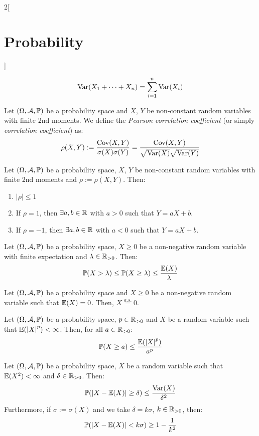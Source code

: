 \documentclass[../../../main.tex]{subfiles}
\begin{document}
\begin{multicols}{2}[\section{Probability}]
\begin{corollary}
        $$\operatorname{Var}(X_1+\cdots+X_n)=\sum_{i=1}^n\operatorname{Var}(X_i)$$
    \end{corollary}
    \begin{definition}
        Let $(\Omega,\mathcal{A},\mathbb{P})$ be a probability space and $X$, $Y$ be non-constant random variables with finite 2nd moments. We define the \textit{Pearson correlation coefficient} (or simply \textit{correlation coefficient}) as: $$\rho(X,Y):=\frac{\operatorname{Cov}(X,Y)}{\sigma(X)\sigma(Y)}=\frac{\operatorname{Cov}(X,Y)}{\sqrt{\operatorname{Var}(X)}\sqrt{\operatorname{Var}(Y)}}$$
    \end{definition}
    \begin{prop}
        Let $(\Omega,\mathcal{A},\mathbb{P})$ be a probability space, $X$, $Y$ be non-constant random variables with finite 2nd moments and $\rho:=\rho(X,Y)$. Then:
        \begin{enumerate}
            \item $|\rho|\leq 1$
            \item If $\rho=1$, then $\exists a,b\in\mathbb{R}$ with $a>0$ such that $Y=aX+b$.
            \item If $\rho=-1$, then $\exists a,b\in\mathbb{R}$ with $a<0$ such that $Y=aX+b$.
        \end{enumerate}
    \end{prop}
    \begin{theorem}
        Let $(\Omega,\mathcal{A},\mathbb{P})$ be a probability space, $X\geq 0$ be a non-negative random variable with finite expectation and $\lambda\in\mathbb{R}_{>0}$. Then:
        $$\mathbb{P}(X>\lambda)\leq \mathbb{P}(X\geq \lambda)\leq \frac{\mathbb{E}(X)}{\lambda}$$
    \end{theorem}
    \begin{corollary}
        Let $(\Omega,\mathcal{A},\mathbb{P})$ be a probability space and $X\geq 0$ be a non-negative random variable such that $\mathbb{E}(X)=0$. Then, $X\overset{a.s.}{=}0$.
    \end{corollary}
    \begin{corollary}
        Let $(\Omega,\mathcal{A},\mathbb{P})$ be a probability space, $p\in\mathbb{R}_{>0}$ and $X$ be a random variable such that $\mathbb{E}({|X|}^p)<\infty$. Then, for all $a\in\mathbb{R}_{>0}$: $$\mathbb{P}(X\geq a)\leq \frac{\mathbb{E}({|X|}^p)}{a^p}$$
    \end{corollary}
    \begin{corollary}
        Let $(\Omega,\mathcal{A},\mathbb{P})$ be a probability space, $X$ be a random variable such that $\mathbb{E}(X^2)<\infty$ and $\delta\in\mathbb{R}_{>0}$. Then: $$\mathbb{P}(|X-\mathbb{E}(X)|\geq\delta)\leq\frac{\operatorname{Var}(X)}{\delta^2}$$ Furthermore, if $\sigma:=\sigma(X)$ and we take $\delta=k\sigma$, $k\in\mathbb{R}_{>0}$, then: $$\mathbb{P}(|X-\mathbb{E}(X)|<k\sigma)\geq1-\frac{1}{k^2}$$

\end{corollary}
\end{multicols}
\end{document}
